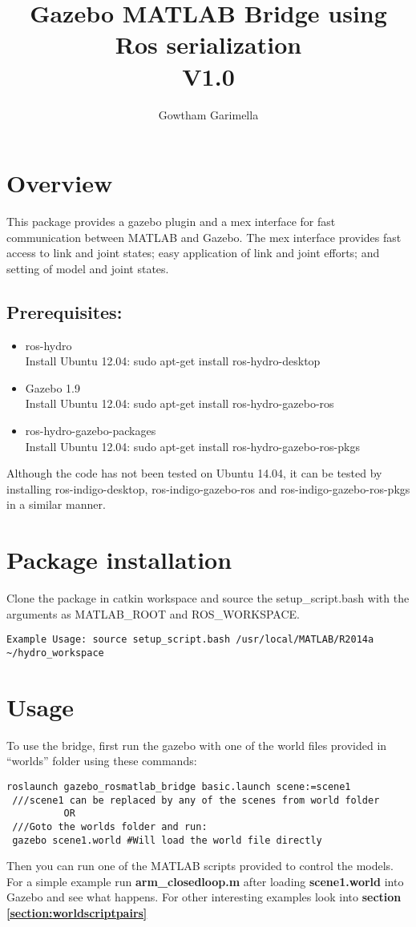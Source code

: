 \documentclass[letterpaper,10pt]{article}
\title{Gazebo MATLAB Bridge using Ros serialization \\V1.0} \label{gazebo-matlab-bridge-using-ros-serialization}
\author{Gowtham Garimella}
\begin{document}
\maketitle

\section{Overview}
This package provides a gazebo plugin and a mex interface for fast
communication between MATLAB and Gazebo. The mex interface provides fast
access to link and joint states; easy application of link and joint
efforts; and setting of model and joint states. 
\subsection{Prerequisites:}
\begin{itemize}
 \item  ros-hydro \\ Install Ubuntu 12.04: sudo apt-get install ros-hydro-desktop
 \item Gazebo 1.9  \\ Install Ubuntu 12.04: sudo apt-get install ros-hydro-gazebo-ros
 \item ros-hydro-gazebo-packages \\ Install Ubuntu 12.04: sudo apt-get install ros-hydro-gazebo-ros-pkgs
\end{itemize}
Although the code has not been tested on Ubuntu 14.04, it can be tested by installing ros-indigo-desktop, ros-indigo-gazebo-ros and ros-indigo-gazebo-ros-pkgs in a similar manner.

\section{Package installation}
Clone the package in catkin workspace and source the
setup\_script.bash with the arguments as MATLAB\_ROOT and
ROS\_WORKSPACE.
\begin{Verbatim}[frame=single]
Example Usage: source setup_script.bash /usr/local/MATLAB/R2014a ~/hydro_workspace
\end{Verbatim}
\section{Usage} 
To use the bridge, first run the gazebo with one of the world files provided in ``worlds''
folder using these commands: 
\begin{Verbatim}[frame=single]
 roslaunch gazebo_rosmatlab_bridge basic.launch scene:=scene1 
 ///scene1 can be replaced by any of the scenes from world folder
		  OR
 ///Goto the worlds folder and run:
 gazebo scene1.world #Will load the world file directly
\end{Verbatim}
Then you can run one of the MATLAB scripts provided to control
the models. For a simple example run \textbf{arm\_closedloop.m} after loading \textbf{scene1.world} into Gazebo and see what happens. For other interesting examples look into \textbf{section \ref{section:worldscriptpairs} }
\vspace{2pt}
\end{document}
